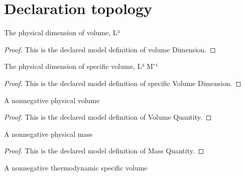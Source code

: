 \section{Declaration topology}
\begin{definition}
  \label{def:physics:phyx-mini-0444:phyxminiproblems-problemphyxmini0444-volumedimension}
  The physical dimension of volume, L³
\end{definition}
\begin{proof}
  This is the declared model definition of volume Dimension.
\end{proof}
\begin{definition}
  \label{def:physics:phyx-mini-0444:phyxminiproblems-problemphyxmini0444-specificvolumedimension}
  The physical dimension of specific volume, L³ M⁻¹
\end{definition}
\begin{proof}
  This is the declared model definition of specific Volume Dimension.
\end{proof}
\begin{definition}
  \label{def:physics:phyx-mini-0444:phyxminiproblems-problemphyxmini0444-volumequantity}
  A nonnegative physical volume
\end{definition}
\begin{proof}
  This is the declared model definition of Volume Quantity.
\end{proof}
\begin{definition}
  \label{def:physics:phyx-mini-0444:phyxminiproblems-problemphyxmini0444-massquantity}
  A nonnegative physical mass
\end{definition}
\begin{proof}
  This is the declared model definition of Mass Quantity.
\end{proof}
\begin{definition}
  \label{def:physics:phyx-mini-0444:phyxminiproblems-problemphyxmini0444-specificvolumequantity}
  A nonnegative thermodynamic specific volume
\end{definition}
